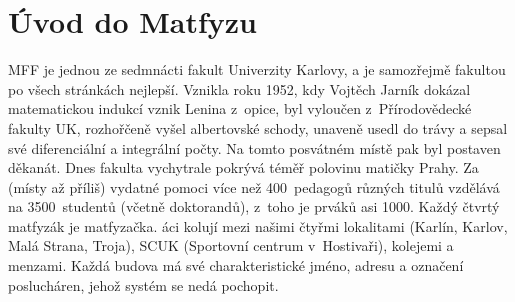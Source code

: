 \section{Úvod do Matfyzu}

MFF je jednou ze sedmnácti fakult Univerzity Karlovy, a je
samozřejmě fakultou po všech stránkách nejlepší. Vznikla roku
1952, kdy Vojtěch Jarník dokázal matematickou indukcí vznik Lenina
z~opice, byl vyloučen z~Přírodovědecké fakulty UK, rozhořčeně
vyšel albertovské schody, unaveně usedl do trávy a sepsal své
diferenciální a integrální počty. Na tomto posvátném místě pak byl
postaven děkanát. Dnes fakulta vychytrale pokrývá téměř polovinu
matičky Prahy. Za (místy až příliš) vydatné pomoci více než
400~pedagogů různých titulů vzdělává na 3500~studentů (včetně
doktorandů), z~toho je prváků asi 1000. Každý čtvrtý matfyzák je
matfyzačka. \Mfz{}áci kolují mezi našimi čtyřmi lokalitami (Karlín,
Karlov, Malá Strana, Troja), SCUK (Sportovní centrum v~Hostivaři),
kolejemi a menzami. Každá budova má své charakteristické jméno,
adresu a označení poslucháren, jehož systém se nedá pochopit.

